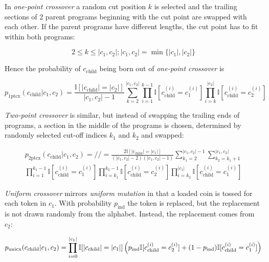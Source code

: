 In \emph{one-point crossover} a random cut position $k$ is selected and the trailing sections of 2 parent programs beginning with the cut point are swapped with each other. 
If the parent programs have different lengths, the cut point has to fit within both programs:

\begin{equation}
    2 \leq k \leq |c_1,c_2|; |c_1,c_2| = \min\{|c_1|, |c_2|\}
\end{equation}

Hence the probability of $c_\text{child}$ being born out of \emph{one-point crossover} is

\begin{equation}
    p_\text{1ptcx}(c_\text{child}|c_1,c_2) =
        \frac{\mathbb{I}[|c_\text{child}|=|c_2|]}{|c_1,c_2|-1}
        \sum\limits_{k=2}^{|c_1,c_2|} \prod\limits_{i=1}^{k-1} \mathbb{I}[c_\text{child}^{(i)} = c_1^{(i)}] \prod\limits_{i=k}^{|c_2|} \mathbb{I}[c_\text{child}^{(i)} = c_2^{(i)}]
\end{equation}

\emph{Two-point crossover} is similar, but instead of swapping the trailing ends of programs, a section in the middle of the programs is chosen, determined by randomly selected cut-off indices $k_1$ and $k_2$ and swapped:

\begin{equation}
\begin{split}
    p_\text{2ptcx}(c_\text{child}|c_1,c_2) = // =
        \frac{2 \mathbb{I}[|c_\text{child}|=|c_1|]}{(|c_1,c_2|-2)(|c_1,c_2|-1)}
        \sum\limits_{k_1=2}^{|c_1,c_2|-1}
        \sum\limits_{k_2=k_1+1}^{|c_1,c_2|} \\
        \prod\limits_{i=1}^{k_1-1} \mathbb{I}[c_\text{child}^{(i)} = c_1^{(i)}] \prod\limits_{i=k_1}^{k_2-1} \mathbb{I}[c_\text{child}^{(i)} = c_2^{(i)}]
        \prod\limits_{i=k_2}^{|c_1|} \mathbb{I}[c_\text{child}^{(i)} = c_1^{(i)}]
\end{split}
\end{equation}

\emph{Uniform crossover} mirrors \emph{uniform mutation} in that a loaded coin is tossed for each token in $c_1$. With probability $p_\text{ind}$ the token is replaced, but the replacement is not drawn randomly from the alphabet. Instead, the replacement comes from $c_2$:

\begin{equation}
    p_\text{unicx}(c_\text{child}|c_1,c_2) = \prod\limits_{i=0}^{|c_1|} \mathbb{I}[|c_\text{child}|=|c_1|] \\ \left(p_\text{ind} \mathbb{I}[c_\text{child}^{(i)} = c_2^{(i)}] + (1 - p_\text{ind}) \mathbb{I}[c_\text{child}^{(i)} = c_1^{(i)}] \right)
\end{equation}

